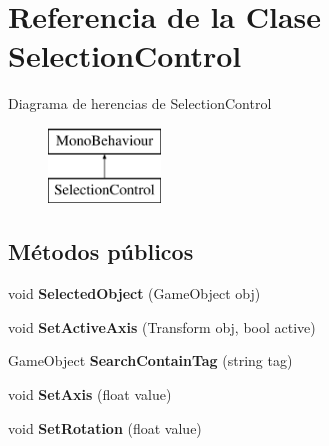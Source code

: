 \hypertarget{class_selection_control}{}\section{Referencia de la Clase Selection\+Control}
\label{class_selection_control}
Diagrama de herencias de Selection\+Control\begin{figure}[H]
\begin{center}
\leavevmode
\includegraphics[height=2.000000cm]{class_selection_control}
\end{center}
\end{figure}
\subsection*{Métodos públicos}
\begin{DoxyCompactItemize}
\item 
\mbox{\label{class_selection_control_a3da021bd2d11255eadadc832b40e6fb6}} 
void {\bfseries Selected\+Object} (Game\+Object obj)
\item 
\mbox{\label{class_selection_control_af45a0f8f9cf7f200e423971f190d8bbf}} 
void {\bfseries Set\+Active\+Axis} (Transform obj, bool active)
\item 
\mbox{\label{class_selection_control_a8e92014a9781e84be7079f4dfd96caf9}} 
Game\+Object {\bfseries Search\+Contain\+Tag} (string tag)
\item 
\mbox{\label{class_selection_control_a5d456be16e3132ae65d37f866ee009f3}} 
void {\bfseries Set\+Axis} (float value)
\item 
\mbox{\label{class_selection_control_ae30e28c63db233cb7a7b9d71174c2846}} 
void {\bfseries Set\+Rotation} (float value)
\end{DoxyCompactItemize}

